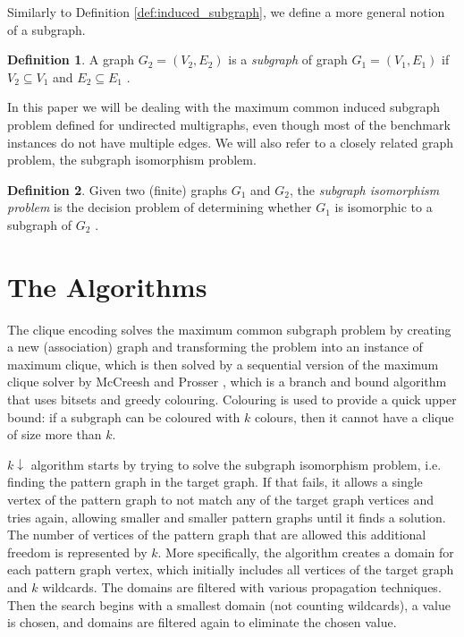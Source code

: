 \documentclass{l4proj}
\theoremstyle{definition}
\newtheorem{definition}{Definition}[section]
\theoremstyle{remark}
\begin{document}
Similarly to Definition \ref{def:induced_subgraph}, we define a more general
notion of a subgraph.

\begin{definition} A graph $G_2 = (V_2, E_2)$ is a \emph{subgraph} of graph $G_1
  = (V_1, E_1)$ if $V_2 \subseteq V_1$ and $E_2 \subseteq E_1$
  \cite{DBLP:books/daglib/0030488}.
\end{definition}

In this paper we will be dealing with the maximum common induced subgraph
problem defined for undirected multigraphs, even though most of the benchmark
instances do not have multiple edges. We will also refer to a closely related
graph problem, the subgraph isomorphism problem.

\begin{definition}
  Given two (finite) graphs $G_1$ and $G_2$, the \emph{subgraph isomorphism
    problem} is the decision problem of determining whether $G_1$ is isomorphic
  to a subgraph of $G_2$ \cite{DBLP:conf/stoc/Cook71}.
\end{definition}

\chapter{The Algorithms}
The clique encoding \cite{DBLP:conf/cp/McCreeshNPS16} solves the maximum common
subgraph problem by creating a new (association) graph and transforming the
problem into an instance of maximum clique, which is then solved by a sequential
version of the maximum clique solver by McCreesh and Prosser
\cite{DBLP:journals/topc/McCreeshP15}, which is a branch and bound algorithm
that uses bitsets and greedy colouring. Colouring is used to provide a quick
upper bound: if a subgraph can be coloured with $k$ colours, then it cannot have
a clique of size more than $k$.

$k\downarrow$ algorithm \cite{DBLP:conf/aaai/HoffmannMR17} starts by trying to
solve the subgraph isomorphism problem, i.e. finding the pattern graph in the
target graph. If that fails, it allows a single vertex of the pattern graph to
not match any of the target graph vertices and tries again, allowing smaller and
smaller pattern graphs until it finds a solution. The number of vertices of the
pattern graph that are allowed this additional freedom is represented by $k$.
More specifically, the algorithm creates a domain for each pattern graph vertex,
which initially includes all vertices of the target graph and $k$ wildcards. The
domains are filtered with various propagation techniques. Then the search begins
with a smallest domain (not counting wildcards), a value is chosen, and domains
are filtered again to eliminate the chosen value.
\end{document}
